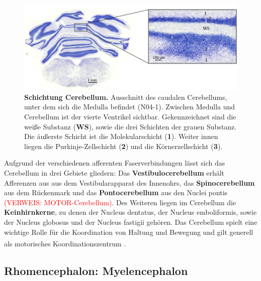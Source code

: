 \documentclass[12pt,a4paper,pdftex]{article}
\begin{document}
\begin{figure}[H]
    \centering
    \includegraphics[width=\textwidth]{pictures/Bilder_Jule/Ratte/cerebellum.png}
    \caption[Schichtung Cerebellum]{\textbf{Schichtung Cerebellum.} Ausschnitt des caudalen Cerebellums, unter dem sich die Medulla befindet (N04-1). Zwischen Medulla und Cerebellum ist der vierte Ventrikel sichtbar. Gekennzeichnet sind die weiße Substanz (\textbf{WS}), sowie die drei Schichten der grauen Substanz. Die äußerste Schicht ist die Molekularschicht (\textbf{1}). Weiter innen liegen die Purkinje-Zellschicht (\textbf{2}) und die Körnerzellschicht (\textbf{3}).}
    \label{fig:cerebellum_ratte}
\end{figure}

\noindent Aufgrund der verschiedenen afferenten Faserverbindungen lässt sich das Cerebellum in drei Gebiete gliedern: Das \textbf{Vestibulocerebellum} erhält Afferenzen aus aus dem Vestibularapparat des Innenohrs, das \textbf{Spinocerebellum} aus dem Rückenmark und das \textbf{Pontocerebellum} aus den Nuclei pontis \textcolor{red}{(VERWEIS: MOTOR-Cerebellum)}. Des Weiteren liegen im Cerebellum die \textbf{Keinhirnkerne}, zu denen der Nucleus dentatus, der Nucleus emboliformis, sowie der Nucleus globosus und der Nucleus fastigii gehören. Das Cerebellum spielt eine wichtige Rolle für die Koordination von Haltung und Bewegung und gilt generell als motorisches Koordinationszentrum \textsuperscript{\cite[7]{trepel2011neuroanatomie}}.




\subsection{Rhomencephalon: Myelencephalon}
\label{subsec:Myelencephalon} 
\end{document}
